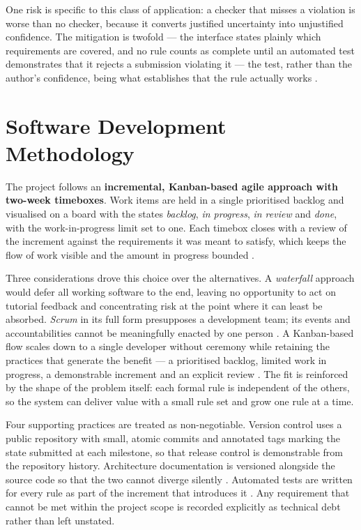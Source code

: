 \documentclass[a4paper,11pt]{article}
\begin{document}
One risk is specific to this class of application: a checker that misses a
violation is worse than no checker, because it converts justified uncertainty
into unjustified confidence. The mitigation is twofold --- the interface states
plainly which requirements are covered, and no rule counts as complete until an
automated test demonstrates that it rejects a submission violating it --- the
test, rather than the author's confidence, being what establishes that the rule
actually works \citep{Khorikov2020}.

\section{Software Development Methodology}\label{sec:methodology}

The project follows an \textbf{incremental, Kanban-based agile approach with
two-week timeboxes}. Work items are held in a single prioritised backlog and
visualised on a board with the states \textit{backlog}, \textit{in progress},
\textit{in review} and \textit{done}, with the work-in-progress limit set to
one. Each timebox closes with a review of the increment against the requirements
it was meant to satisfy, which keeps the flow of work visible and the amount in
progress bounded \citep{Ambler2022}.

Three considerations drove this choice over the alternatives. A
\textit{waterfall} approach would defer all working software to the end, leaving
no opportunity to act on tutorial feedback and concentrating risk at the point
where it can least be absorbed. \textit{Scrum} in its full form presupposes a
development team; its events and accountabilities cannot be meaningfully enacted
by one person \citep{Schwaber2020}. A Kanban-based flow scales down to a single
developer without ceremony while retaining the practices that generate the
benefit --- a prioritised backlog, limited work in progress, a demonstrable
increment and an explicit review \citep{Ambler2022}. The fit is reinforced by
the shape of the problem itself: each formal rule is independent of the others,
so the system can deliver value with a small rule set and grow one rule at a
time.

Four supporting practices are treated as non-negotiable. Version control uses a
public repository with small, atomic commits and annotated tags marking the
state submitted at each milestone, so that release control is demonstrable from
the repository history. Architecture documentation is versioned alongside the
source code so that the two cannot diverge silently \citep{Bass2021}. Automated
tests are written for every rule as part of the increment that introduces it
\citep{Khorikov2020}. Any requirement that cannot be met within the project
scope is recorded explicitly as technical debt rather than left unstated.
\end{document}
